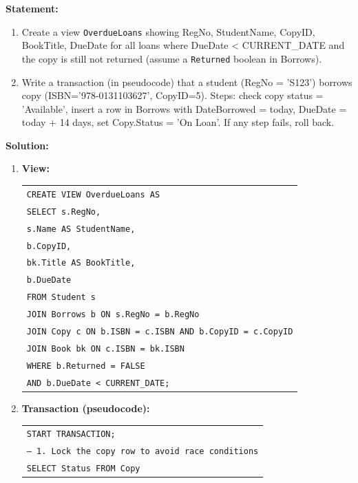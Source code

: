 \documentclass[11pt]{article}
\begin{document}
\begin{exoresolu}
\textbf{Statement:}
\begin{enumerate}
\item Create a view \texttt{OverdueLoans} showing RegNo, StudentName, CopyID, BookTitle, DueDate for all loans where DueDate < CURRENT\_DATE and the copy is still not returned (assume a \texttt{Returned} boolean in Borrows).
\item Write a transaction (in pseudocode) that a student (RegNo = 'S123') borrows copy (ISBN='978-0131103627', CopyID=5). Steps: check copy status = 'Available', insert a row in Borrows with DateBorrowed = today, DueDate = today + 14 days, set Copy.Status = 'On Loan'. If any step fails, roll back.
\end{enumerate}
\tcblower
\textbf{Solution:}
\begin{enumerate}
\item \textbf{View:}
\begin{center}
\begin{tabular}{|l|}
\hline
\texttt{CREATE VIEW OverdueLoans AS} \\
\texttt{SELECT s.RegNo,} \\
\texttt{\quad s.Name AS StudentName,} \\
\texttt{\quad b.CopyID,} \\
\texttt{\quad bk.Title AS BookTitle,} \\
\texttt{\quad b.DueDate} \\
\texttt{FROM Student s} \\
\texttt{JOIN Borrows b ON s.RegNo = b.RegNo} \\
\texttt{JOIN Copy c ON b.ISBN = c.ISBN AND b.CopyID = c.CopyID} \\
\texttt{JOIN Book bk ON c.ISBN = bk.ISBN} \\
\texttt{WHERE b.Returned = FALSE} \\
\texttt{\quad AND b.DueDate < CURRENT\_DATE;} \\
\hline
\end{tabular}
\end{center}
\item \textbf{Transaction (pseudocode):}
\begin{center}
\begin{tabular}{|l|}
\hline
\texttt{START TRANSACTION;} \\
\texttt{-- 1. Lock the copy row to avoid race conditions} \\
\texttt{SELECT Status FROM Copy} \\

\end{tabular}
\end{center}
\end{enumerate}
\end{exoresolu}
\end{document}
